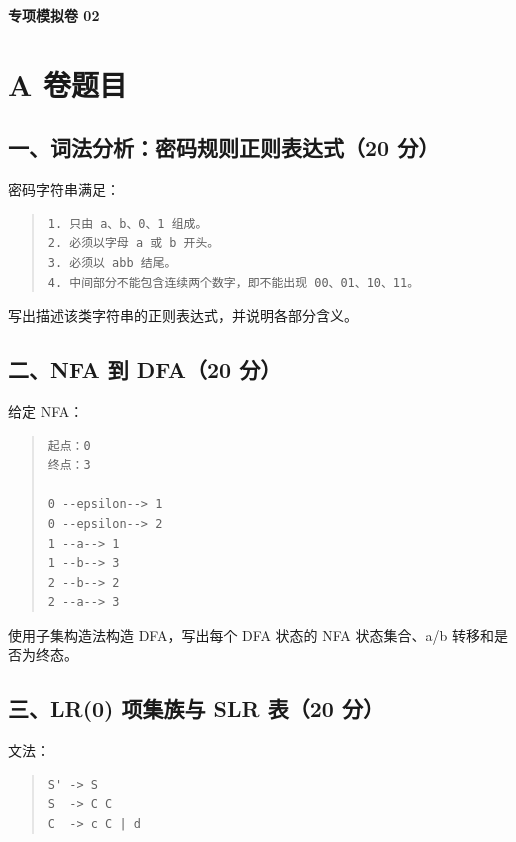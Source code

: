 \documentclass[UTF8,zihao=-4]{ctexart}
\begin{document}
\clearpage
\begin{center}
{\bfseries 专项模拟卷 02}
\end{center}

\section*{A 卷题目}

\subsection*{一、词法分析：密码规则正则表达式（20 分）}

密码字符串满足：

\begin{quote}
\footnotesize
\begin{verbatim}
1. 只由 a、b、0、1 组成。
2. 必须以字母 a 或 b 开头。
3. 必须以 abb 结尾。
4. 中间部分不能包含连续两个数字，即不能出现 00、01、10、11。
\end{verbatim}
\end{quote}

写出描述该类字符串的正则表达式，并说明各部分含义。

\subsection*{二、NFA 到 DFA（20 分）}

给定 NFA：

\begin{quote}
\footnotesize
\begin{verbatim}
起点：0
终点：3

0 --epsilon--> 1
0 --epsilon--> 2
1 --a--> 1
1 --b--> 3
2 --b--> 2
2 --a--> 3
\end{verbatim}
\end{quote}

使用子集构造法构造 DFA，写出每个 DFA 状态的 NFA 状态集合、a/b 转移和是否为终态。

\subsection*{三、LR(0) 项集族与 SLR 表（20 分）}

文法：

\begin{quote}
\footnotesize
\begin{verbatim}
S' -> S
S  -> C C
C  -> c C | d
\end{verbatim}
\end{quote}
\end{document}
